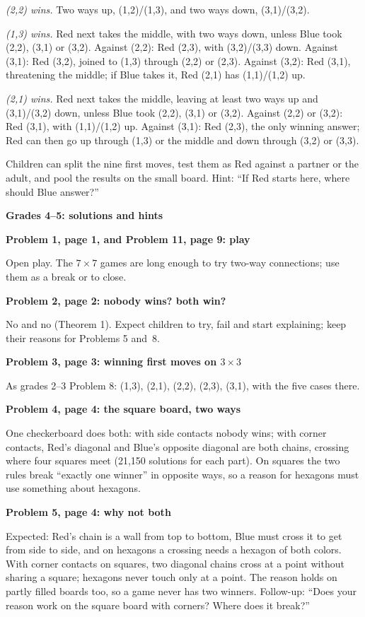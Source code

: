 \documentclass[11pt]{article}
\newcommand{\head}[1]{\par\textbf{\large #1}\par\nopagebreak}
\newcommand{\sub}[1]{\par\textbf{#1}\par\nopagebreak}
\newcommand{\x}{\ensuremath{\times}}
\begin{document}
\emph{(2,2) wins.} Two ways up, (1,2)/(1,3), and two ways down, (3,1)/(3,2).

\emph{(1,3) wins.} Red next takes the middle, with two ways down, unless Blue took (2,2), (3,1) or (3,2). Against (2,2): Red (2,3), with (3,2)/(3,3) down. Against (3,1): Red (3,2), joined to (1,3) through (2,2) or (2,3). Against (3,2): Red (3,1), threatening the middle; if Blue takes it, Red (2,1) has (1,1)/(1,2) up.

\emph{(2,1) wins.} Red next takes the middle, leaving at least two ways up and (3,1)/(3,2) down, unless Blue took (2,2), (3,1) or (3,2). Against (2,2) or (3,2): Red (3,1), with (1,1)/(1,2) up. Against (3,1): Red (2,3), the only winning answer; Red can then go up through (1,3) or the middle and down through (3,2) or (3,3).

Children can split the nine first moves, test them as Red against a partner or the adult, and pool the results on the small board. Hint: ``If Red starts here, where should Blue answer?''

\head{Grades 4--5: solutions and hints}
\sub{Problem 1, page 1, and Problem 11, page 9: play}
Open play. The $7\x7$ games are long enough to try two-way connections; use them as a break or to close.

\sub{Problem 2, page 2: nobody wins? both win?}
No and no (Theorem 1). Expect children to try, fail and start explaining; keep their reasons for Problems 5 and~8.

\sub{Problem 3, page 3: winning first moves on $3\x3$}
As grades 2--3 Problem 8: (1,3), (2,1), (2,2), (2,3), (3,1), with the five cases there.

\sub{Problem 4, page 4: the square board, two ways}
One checkerboard does both: with side contacts nobody wins; with corner contacts, Red's diagonal and Blue's opposite diagonal are both chains, crossing where four squares meet (21{,}150 solutions for each part). On squares the two rules break ``exactly one winner'' in opposite ways, so a reason for hexagons must use something about hexagons.

\sub{Problem 5, page 4: why not both}
Expected: Red's chain is a wall from top to bottom, Blue must cross it to get from side to side, and on hexagons a crossing needs a hexagon of both colors. With corner contacts on squares, two diagonal chains cross at a point without sharing a square; hexagons never touch only at a point. The reason holds on partly filled boards too, so a game never has two winners. Follow-up: ``Does your reason work on the square board with corners? Where does it break?''
\end{document}
